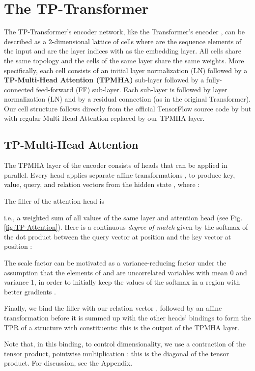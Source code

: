 \documentclass[11pt,a4paper]{article}
\newcommand{\newterm}[1]{{\bf #1}}
\begin{document}
\section{The TP-Transformer}  \label{sec:TPT}
The TP-Transformer's encoder network, like the Transformer's encoder \citep{vaswani2017attention}, can be described as a 2-dimensional lattice of cells  where  are the sequence elements of the input and  are the layer indices with  as the embedding layer.
All cells share the same topology and the cells of the same layer share the same weights. 
More specifically, each cell consists of an initial layer normalization (LN) followed by a \newterm{TP-Multi-Head Attention (TPMHA)} sub-layer followed by a fully-connected feed-forward (FF) sub-layer. Each sub-layer is followed by layer normalization (LN) and by a residual connection (as in the original Transformer). Our cell structure follows directly from the official TensorFlow source code by \cite{vaswani2017attention} but with regular Multi-Head Attention replaced by our TPMHA layer.

\subsection{TP-Multi-Head Attention} \label{sec:TPMA}
The TPMHA layer of the encoder consists of  heads that can be applied in parallel. 
Every head  applies separate affine transformations ,  to produce key, value, query, and relation vectors from the hidden state , where :


The filler of the attention head  is 

i.e., a weighted sum of all  values of the same layer and attention head (see Fig. \ref{fig:TP-Attention}).
Here  is a continuous \textit{degree of match} given by the softmax of the dot product between the query vector at position  and the key vector at position :


The scale factor  can be motivated as a variance-reducing factor under the assumption that the elements of  and  are uncorrelated variables with mean 0 and variance 1, in order to initially keep the values of the softmax in a region with better gradients \cite{vaswani2017attention}.

Finally, we bind the filler  with our relation vector , followed by an affine transformation  before it is summed up with the other heads' bindings to form the TPR of a structure with  constituents: this is the output of the TPMHA layer.


Note that, in this binding, to control dimensionality, we use a contraction of the tensor product, pointwise multiplication : this is the diagonal of the tensor product. For discussion, see the Appendix. 
\end{document}
